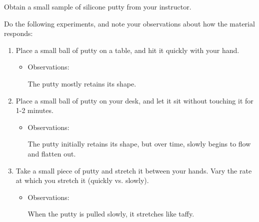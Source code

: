 \begin{activity}
\begin{instructornotes}
\end{instructornotes}


\begin{model}
\label{model:sillyputty}

	Obtain a small sample of silicone putty from your instructor.
	
	Do the following experiments, and note your observations about how the material responds:
	
	\begin{enumerate}
		\item Place a small ball of putty on a table, and hit it quickly with your hand.
			\begin{itemize}
				\item Observations:
				
				\begin{solution}[0.75in]
				
					The putty mostly retains its shape.
					
				\end{solution}
			\end{itemize}
		
		\item Place a small ball of putty on your desk, and let it sit without touching it for 1-2 minutes.
			\begin{itemize}
				\item Observations:
				
				\begin{solution}[0.75in]
				
					The putty initially retains its shape, but over time, slowly begins to flow and flatten out.
					
				\end{solution}
			\end{itemize}
		
		\item Take a small piece of putty and stretch it between your hands.  Vary the rate at which you stretch it (quickly vs. slowly).
			\begin{itemize}
				\item Observations:
				
				\begin{solution}[1in]
				
					When the putty is pulled slowly, it stretches like taffy.
					

\end{solution}
\end{itemize}
\end{enumerate}
\end{model}
\end{activity}

